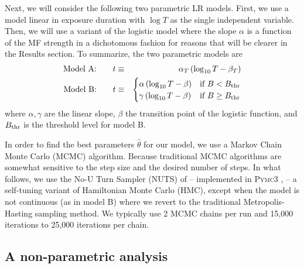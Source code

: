 \documentclass[letter]{article}
\begin{document}
Next, we will consider the following two parametric LR models. First, we use a  model linear in exposure duration with $\log T$ as the single independent variable. Then,  we will use a variant of the logistic model where the slope $\alpha$ is a function of the MF strength in a dichotomous fashion for reasons that will be clearer in the Results section. 
To summarize, the two   parametric models are
\begin{eqnarray}
\hbox{Model A:}\qquad 
t&\equiv&\alpha_T\,(\log_{10} T-\beta_T)   \label{eq:model1}\\
\hbox{Model B:}\qquad 
t&\equiv& \begin{cases}
 \alpha\, ( \log_{10} T - \beta ) & \text{if $ B < B_{\rm thr}$}\\
 \gamma\,( \log_{10} T-\beta ) & \text{if $B\geq B_{\rm thr}$} 
\end{cases}\label{eq:model3}
\end{eqnarray}
where $\alpha,\gamma$ are the linear slope, $\beta$ the transition point of the logistic function, and $B_{\rm thr}$ is the threshold level for model B. 

In order to find the best parameters $\hat \theta$ for our model, we  use a Markov Chain Monte Carlo  
(MCMC) algorithm. Because traditional MCMC algorithms are somewhat sensitive to the step size  and the desired number of steps. In what follows, we use the No-U Turn Sampler (NUTS) of \citet{Hoffman2014} -- implemented in \textsc{Pymc3} \citet{pymc3}, -- a self-tuning variant of Hamiltonian Monte Carlo (HMC), except when the model is not continuous  (as in model B) where we revert to  the traditional Metropolis-Hasting sampling method.
We typically use 2   MCMC chains per run and 15,000 iterations to 25,000 iterations per chain.
 
\subsection*{A non-parametric analysis}
\end{document}
